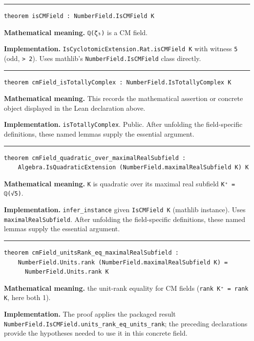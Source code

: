 \documentclass[UTF8,a4paper,11pt,fontset=fandol]{ctexart}
\theoremstyle{definition}
\newcommand{\statementsep}{\par\medskip\hrule\medskip}
\begin{document}
\statementsep
\begin{verbatim}
theorem isCMField : NumberField.IsCMField K
\end{verbatim}
\noindent\textbf{Mathematical meaning.} \texttt{ℚ(ζ₅)} is a CM field.\par
\noindent\textbf{Implementation.} \texttt{IsCyclotomicExtension.\allowbreak{}Rat.\allowbreak{}isCMField K} with witness \texttt{5} (odd, \texttt{> 2}). Uses mathlib's \texttt{NumberField.\allowbreak{}IsCMField} class directly.\par
\statementsep
\begin{verbatim}
theorem cmField_isTotallyComplex : NumberField.IsTotallyComplex K
\end{verbatim}
\noindent\textbf{Mathematical meaning.} This records the mathematical assertion or concrete object displayed in the Lean declaration above.\par
\noindent\textbf{Implementation.} \texttt{isTotallyComplex}. Public. After unfolding the field-specific definitions, these named lemmas supply the essential argument.\par
\statementsep
\begin{verbatim}
theorem cmField_quadratic_over_maximalRealSubfield :
    Algebra.IsQuadraticExtension (NumberField.maximalRealSubfield K) K
\end{verbatim}
\noindent\textbf{Mathematical meaning.} \texttt{K} is quadratic over its maximal real subfield \texttt{K⁺ = ℚ(√5)}.\par
\noindent\textbf{Implementation.} \texttt{infer\_\allowbreak{}instance} given \texttt{IsCMField K} (mathlib instance). Uses \texttt{maximalRealSubfield}. After unfolding the field-specific definitions, these named lemmas supply the essential argument.\par
\statementsep
\begin{verbatim}
theorem cmField_unitsRank_eq_maximalRealSubfield :
    NumberField.Units.rank (NumberField.maximalRealSubfield K) =
      NumberField.Units.rank K
\end{verbatim}
\noindent\textbf{Mathematical meaning.} the unit-rank equality for CM fields (\texttt{rank K⁺ = rank K}, here both 1).\par
\noindent\textbf{Implementation.} The proof applies the packaged result \texttt{NumberField.\allowbreak{}IsCMField.\allowbreak{}units\_\allowbreak{}rank\_\allowbreak{}eq\_\allowbreak{}units\_\allowbreak{}rank}; the preceding declarations provide the hypotheses needed to use it in this concrete field.\par
\end{document}
